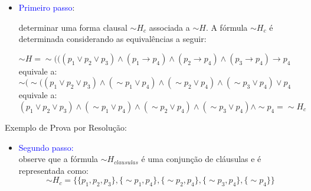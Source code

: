 \begin{frame}

\begin{itemize}
\item \textcolor{blue}{Primeiro passo}: 

determinar uma forma clausal $\sim H_c$ associada a $\sim H$. A fórmula $\sim H_c$ é determinada considerando as equivalências a seguir:

$\scriptstyle \sim H = \sim (((p_1 \vee p_2 \vee p_3) \wedge (p_1 \rightarrow p_4) \wedge (p_2 \rightarrow p_4) \wedge (p_3\rightarrow p_4) \rightarrow p_4$ 
\\
equivale a:
\\
$\scriptstyle \sim (\sim ((p_1 \vee p_2 \vee p_3) \wedge (\sim p_1 \vee p_4) \wedge (\sim p_2 \vee p_4) \wedge (\sim p_3 \vee p_4) \vee p_4$ 
\\
equivale a: 
\\
$\scriptstyle (p_1 \vee p_2 \vee p_3) \wedge (\sim p_1 \vee p_4) \wedge (\sim p_2 \vee p_4) \wedge (\sim p_3 \vee p_4) \wedge \sim p_4 = \sim H_c$

\end{itemize}
\end{frame}

\begin{frame}{Exemplo de Prova por Resolução:}
\begin{itemize}
\item  \textcolor{blue}{Segundo passo:} 
\\
observe que a fórmula $\sim H_{clausulas}$ é uma conjunção de cláusulas e é representada como:
\\
$$\scriptstyle \sim H_c = \{\{p_1, p_2, p_3\},\{\sim p_1, p_4\},\{\sim p_2, p_4\},\{\sim p_3, p_4\},\{\sim p_4\}\}$$
\end{itemize}
\end{frame}


